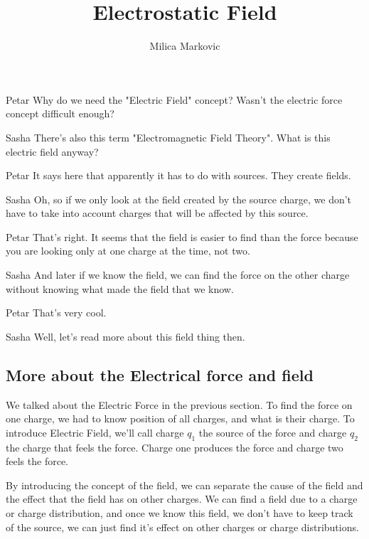 \documentclass{ximera}
\title{Electrostatic Field}
\author{Milica Markovic}
\begin{document}
  
\begin{abstract}  

\end{abstract}  
\maketitle    



\begin{dialogue}
\item[Petar] Why do we need the "Electric Field" concept? Wasn't the electric force concept difficult enough?
\item[Sasha] There's also this term "Electromagnetic Field Theory". What is this electric field anyway? 
\item[Petar] It says here that apparently it has to do with sources. They create fields. 
\item[Sasha] Oh, so if we only look at the field created by the source charge, we don't have to take into account charges that will be affected by this source.
\item[Petar] That's right. It seems that the field is easier to find than the force because you are looking only at one charge at the time, not two.  
\item[Sasha] And later if we know the field, we can find the force on the other charge without knowing what made the field that we know.
\item[Petar] That's very cool. 
\item[Sasha] Well, let's read more about this field thing then.

\end{dialogue}



\subsection{More about the Electrical force and field}

We talked about the Electric Force in the previous section. To find the force on one charge, we had to know position of all charges, and what is their charge.  To introduce Electric Field, we'll call charge $q_1$ the source of the force and charge $q_2$ the charge that feels the force. Charge one produces the force and charge two feels the force. 

By introducing the concept of the field, we can separate the cause of the field and the effect that the field has on other charges. We can find a field due to a charge or charge distribution, and once we know this field, we don't have to keep track of the source, we can just find it's effect on other charges or charge distributions.
\end{document}
